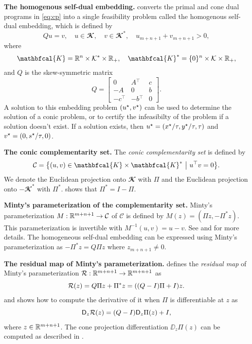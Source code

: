 \textbf{The homogenous self-dual embedding.}
\citet{ye1994nl} converts the primal and cone dual programs
in \cref{eq:cp} into a single feasibility problem called
the homogenous self-dual embedding, which is defined by
\begin{equation}
\label{e:hsde:1}
Qu = v, \quad u \in \mathbfcal{K},
\quad v \in \mathbfcal{K}^*, \quad u_{m+n+1} +
 v_{m+n+1} >0,
\end{equation}
where
\[
\mathbfcal{K} = \RR^n \times \mathcal{K}^*\times \RR_+, \quad
\mathbfcal{K}^* = \{0\}^n\times \mathcal{K}\times \RR_+,
\]
and $Q$ is the skew-symmetric matrix
\[
	Q = \begin{bmatrix}
		0 & A{^\top} & c\\
		-A & 0 & b \\
		-c{^\top} & -b{^\top} & 0
	\end{bmatrix}.
\]
A solution to this embedding problem $({u^\star}, {v^\star})$
can be used to determine the solution of a conic
problem, or to certify the infeasibilty of the
problem if a solution doesn't exist.
If a solution exists, then
${u^\star}=({x^\star}/\tau,{y^\star}/\tau,\tau)$
and
${v^\star}=(0, {s^\star}/\tau, 0)$.

\textbf{The conic complementarity set.}
The \emph{conic complementarity set} is defined by
\begin{equation}
\label{eq:con:com:set}
\mathcal{C} = \menge{(u,v) \in
  \mathbfcal{K} \times \mathbfcal{K}^* }{u^\top v = 0}.
\end{equation}
We denote
the Euclidean projection onto
$\mathbfcal{K}$ with $\Pi$
and
the Euclidean projection onto
$-\mathbfcal{K}^*$ with $\Pi^*$.
\citet{moreau1961decomposition} shows that
$\Pi^*=I-\Pi$.

\textbf{Minty's parameterization of the complementarity set.}
Minty's parameterization $M: \mathbb{R}^{m+n+1} \to \mathcal{C}$
of $\mathcal{C}$ is defined by
$M(z) = (\Pi z, -\Pi^* z)$.
This parameterization is invertible with
$M^{-1}(u,v) = u-v$.
See
\citet[Corollary~31.5.1]{rockafellar1970convex}
and \citet[Remark~23.23(i)]{bauschke2017convex}
for more details.
The homogeneous self-dual embedding can be expressed
using Minty's parameterization as
$-\Pi^* z=Q\Pi z$ where $z_{m+n+1} \neq 0$.

\textbf{The residual map of Minty's parameterization.}
\label{sec-residual-map}
\citet{busseti2018solution} defines the
\emph{residual map} of Minty's parameterization
$\mathcal{R}: \mathbb{R}^{m+n+1}\to \mathbb{R}^{m+n+1}$
as
\begin{equation}
\label{eq-residual}
\mathcal{R}(z) = Q\Pi z+\Pi^*z=((Q-I)\Pi+I)z.
\end{equation}
and shows how to compute the derivative of it
when $\Pi$ is differentiable at $z$ as
\begin{equation}
\label{eq:res:der}
\mathsf{D}_z\mathcal{R}(z) =(Q-I)\mathsf{D}_z\Pi(z) +I,
\end{equation}
where $z\in \mathbb{R}^{m+n+1}$.
The cone projection differentiation $\DD_z \Pi(z)$
can be computed as described in
\citet{ali2017semismooth}.

